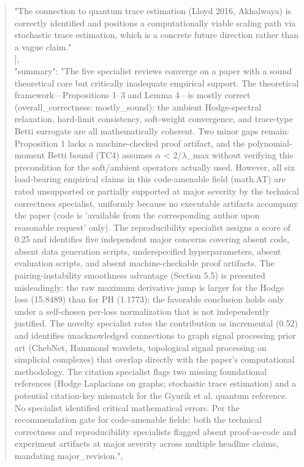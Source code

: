 \documentclass[11pt]{article}
\begin{document}
\begin{quote}
    "The connection to quantum trace estimation (Lloyd 2016, Akhalwaya) is correctly identified and positions a computationally viable scaling path via stochastic trace estimation, which is a concrete future direction rather than a vague claim."\\
  ],\\
  "summary": "The five specialist reviews converge on a paper with a sound theoretical core but critically inadequate empirical support. The theoretical framework---Propositions 1--3 and Lemma 4---is mostly correct (overall\_correctness: mostly\_sound): the ambient Hodge-spectral relaxation, hard-limit consistency, soft-weight convergence, and trace-type Betti surrogate are all mathematically coherent. Two minor gaps remain: Proposition 1 lacks a machine-checked proof artifact, and the polynomial-moment Betti bound (TC4) assumes \ensuremath{\alpha} < 2/\ensuremath{\lambda}\_max without verifying this precondition for the soft/ambient operators actually used. However, all six load-bearing empirical claims in this code-amenable field (math.AT) are rated unsupported or partially supported at major severity by the technical correctness specialist, uniformly because no executable artifacts accompany the paper (code is 'available from the corresponding author upon reasonable request' only). The reproducibility specialist assigns a score of 0.25 and identifies five independent major concerns covering absent code, absent data generation scripts, underspecified hyperparameters, absent evaluation scripts, and absent machine-checkable proof artifacts. The pairing-instability smoothness advantage (Section 5.5) is presented misleadingly: the raw maximum derivative jump is larger for the Hodge loss (15.8489) than for PH (1.1773); the favorable conclusion holds only under a self-chosen per-loss normalization that is not independently justified. The novelty specialist rates the contribution as incremental (0.52) and identifies unacknowledged connections to graph signal processing prior art (ChebNet, Hammond wavelets, topological signal processing on simplicial complexes) that overlap directly with the paper's computational methodology. The citation specialist flags two missing foundational references (Hodge Laplacians on graphs; stochastic trace estimation) and a potential citation-key mismatch for the Gyurik et al. quantum reference. No specialist identified critical mathematical errors. Per the recommendation gate for code-amenable fields: both the technical correctness and reproducibility specialists flagged absent proof-as-code and experiment artifacts at major severity across multiple headline claims, mandating major\_revision.",\\

\end{quote}
\end{document}
